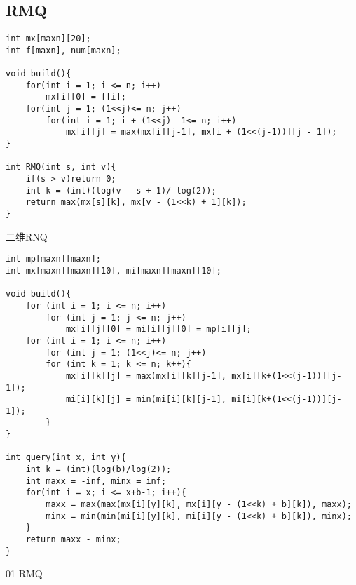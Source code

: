 \subsection{RMQ}

\begin{lstlisting}
int mx[maxn][20];
int f[maxn], num[maxn];

void build(){
    for(int i = 1; i <= n; i++)
        mx[i][0] = f[i];
    for(int j = 1; (1<<j)<= n; j++)
        for(int i = 1; i + (1<<j)- 1<= n; i++)
            mx[i][j] = max(mx[i][j-1], mx[i + (1<<(j-1))][j - 1]);
}

int RMQ(int s, int v){
    if(s > v)return 0;
    int k = (int)(log(v - s + 1)/ log(2));
    return max(mx[s][k], mx[v - (1<<k) + 1][k]);
}	
\end{lstlisting}

二维RNQ
\begin{lstlisting}
int mp[maxn][maxn];
int mx[maxn][maxn][10], mi[maxn][maxn][10];

void build(){
    for (int i = 1; i <= n; i++)
        for (int j = 1; j <= n; j++)
            mx[i][j][0] = mi[i][j][0] = mp[i][j];
    for (int i = 1; i <= n; i++)
        for (int j = 1; (1<<j)<= n; j++)
        for (int k = 1; k <= n; k++){
            mx[i][k][j] = max(mx[i][k][j-1], mx[i][k+(1<<(j-1))][j-1]);
            mi[i][k][j] = min(mi[i][k][j-1], mi[i][k+(1<<(j-1))][j-1]);
        }
}

int query(int x, int y){
    int k = (int)(log(b)/log(2));
    int maxx = -inf, minx = inf;
    for(int i = x; i <= x+b-1; i++){
        maxx = max(max(mx[i][y][k], mx[i][y - (1<<k) + b][k]), maxx);
        minx = min(min(mi[i][y][k], mi[i][y - (1<<k) + b][k]), minx);
    }
    return maxx - minx;
}
\end{lstlisting}

01 RMQ

